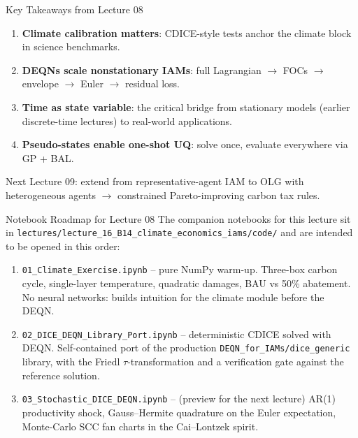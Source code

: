 \documentclass[aspectratio=169,11pt]{beamer}
\newcommand{\emphc}[1]{\textcolor{harvardcrimson}{#1}}
\begin{document}
\begin{frame}{Key Takeaways from Lecture 08}
\begin{enumerate}
    \item \textbf{Climate calibration matters}: CDICE-style tests anchor the climate block in science benchmarks.
    \item \textbf{DEQNs scale nonstationary IAMs}: full Lagrangian $\rightarrow$ FOCs $\rightarrow$ envelope $\rightarrow$ Euler $\rightarrow$ residual loss.
    \item \textbf{Time as state variable}: the critical bridge from stationary models (earlier discrete-time lectures) to real-world applications.
    \item \textbf{Pseudo-states enable one-shot UQ}: solve once, evaluate everywhere via GP + BAL.
\end{enumerate}

\vspace{0.3cm}
\begin{block}{Next}
Lecture 09: extend from representative-agent IAM to \emphc{OLG with heterogeneous agents} $\rightarrow$ constrained Pareto-improving carbon tax rules.
\end{block}
\end{frame}

\begin{frame}{Notebook Roadmap for Lecture 08}
\small
The companion notebooks for this lecture sit in \texttt{lectures/lecture\_16\_B14\_climate\_economics\_iams/code/} and are intended to be opened in this order:
\vspace{0.2cm}
\begin{enumerate}
    \item \texttt{01\_Climate\_Exercise.ipynb} -- pure NumPy warm-up. Three-box carbon cycle, single-layer temperature, quadratic damages, BAU vs 50\% abatement. No neural networks: builds intuition for the climate module before the DEQN.
    \item \texttt{02\_DICE\_DEQN\_Library\_Port.ipynb} -- deterministic CDICE solved with DEQN. Self-contained port of the production \texttt{DEQN\_for\_IAMs/dice\_generic} library, with the Friedl $\tau$-transformation and a verification gate against the reference solution.
    \item \texttt{03\_Stochastic\_DICE\_DEQN.ipynb} -- (preview for the next lecture) AR(1) productivity shock, Gauss--Hermite quadrature on the Euler expectation, Monte-Carlo SCC fan charts in the Cai--Lontzek spirit.
\end{enumerate}
\end{frame}
\end{document}

